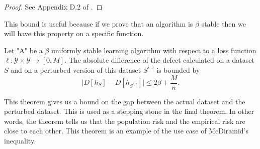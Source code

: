 \documentclass{article}
\begin{document}
\begin{proof}
See Appendix D.2 of \cite{mohri2012foundations}.
\end{proof}
This bound is useful because if we prove that an algorithm is $\beta$ stable then we will have this property on a specific function.
\begin{thm}\label{def_bound} Let "A" be a $\beta$ uniformly stable learning algorithm with respect to a loss function $\ell: \mathcal{Y} \times \mathcal{Y} \rightarrow [0, M]$. The absolute difference of the defect calculated on a dataset $S$ and on a perturbed version of this dataset $S^{i, z}$ is bounded by
\[
\biggl|D[h_S] - D[h_{S^{i,z}}]\biggr| \leq 2\beta + \frac{M}{n}.
\]
\end{thm}
This theorem gives us a bound on the gap between the actual dataset and the perturbed dataset. This is used as a stepping stone in the final theorem. In other words, the theorem tells us that the population risk and the empirical risk are close to each other. This theorem is an example of the use case of McDiramid's inequality.
\end{document}
